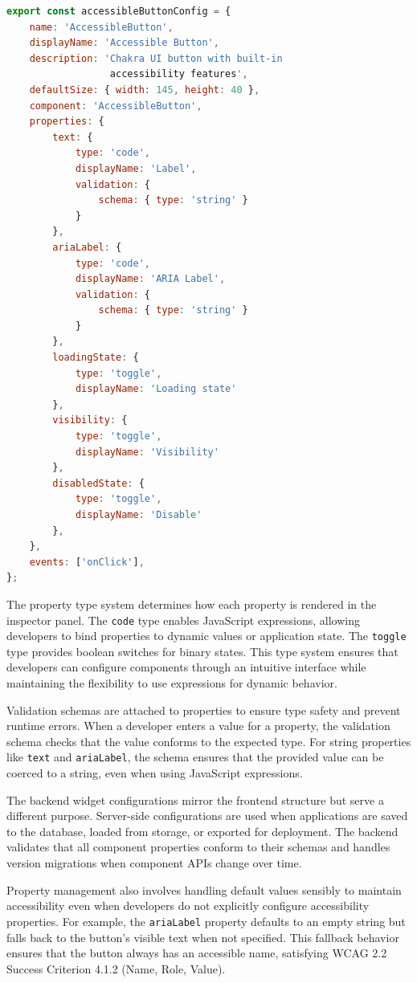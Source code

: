 \begin{lstlisting}[language=JavaScript, caption=Frontend Widget Configuration]
export const accessibleButtonConfig = {
    name: 'AccessibleButton',
    displayName: 'Accessible Button',
    description: 'Chakra UI button with built-in 
                  accessibility features',
    defaultSize: { width: 145, height: 40 },
    component: 'AccessibleButton',
    properties: {
        text: { 
            type: 'code', 
            displayName: 'Label',
            validation: { 
                schema: { type: 'string' }
            }
        },
        ariaLabel: { 
            type: 'code', 
            displayName: 'ARIA Label',
            validation: { 
                schema: { type: 'string' }
            }
        },
        loadingState: { 
            type: 'toggle', 
            displayName: 'Loading state'
        },
        visibility: { 
            type: 'toggle', 
            displayName: 'Visibility'
        },
        disabledState: { 
            type: 'toggle', 
            displayName: 'Disable'
        },
    },
    events: ['onClick'],
};
\end{lstlisting}

The property type system determines how each property is rendered in the inspector panel. The \texttt{code} type enables JavaScript expressions, allowing developers to bind properties to dynamic values or application state. The \texttt{toggle} type provides boolean switches for binary states. This type system ensures that developers can configure components through an intuitive interface while maintaining the flexibility to use expressions for dynamic behavior.

Validation schemas are attached to properties to ensure type safety and prevent runtime errors. When a developer enters a value for a property, the validation schema checks that the value conforms to the expected type. For string properties like \texttt{text} and \texttt{ariaLabel}, the schema ensures that the provided value can be coerced to a string, even when using JavaScript expressions.

The backend widget configurations mirror the frontend structure but serve a different purpose. Server-side configurations are used when applications are saved to the database, loaded from storage, or exported for deployment. The backend validates that all component properties conform to their schemas and handles version migrations when component APIs change over time.

Property management also involves handling default values sensibly to maintain accessibility even when developers do not explicitly configure accessibility properties. For example, the \texttt{ariaLabel} property defaults to an empty string but falls back to the button's visible text when not specified. This fallback behavior ensures that the button always has an accessible name, satisfying WCAG 2.2 \cite{WCAG22} Success Criterion 4.1.2 (Name, Role, Value).

